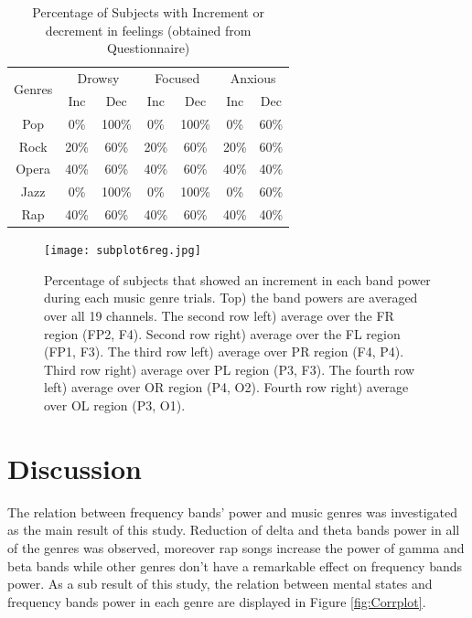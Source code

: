 \documentclass[9pt,twocolumn]{paper-template}
\begin{document}
\begin{table}
\centering
\caption{Percentage of Subjects with Increment or decrement in feelings  (obtained from Questionnaire) }
\label{table:POIOD}
  \begin{tabular}{c | c c | c c | c c}
        \multirow{2}{*}{Genres} &
      \multicolumn{2}{c}{Drowsy} &
      \multicolumn{2}{c}{Focused} &
      \multicolumn{2}{c}{Anxious} \\
    & Inc & Dec & Inc& Dec & Inc & Dec \\
    \hline
    Pop & 0\% & 100\% & 0\% & 100\% & 0\% & 60\% \\
        Rock & 20\% & 60\% & 20\% & 60\% & 20\% & 60\% \\
        Opera & 40\% & 60\% & 40\% & 60\% & 40\% & 40\% \\
        Jazz & 0\% & 100\% & 0\% & 100\% & 0\% & 60\% \\
        Rap & 40\% & 60\% & 40\% & 60\% & 40\% & 40\% \\
      \end{tabular}
\end{table}





\begin{figure}[h!]
	\centering
	\texttt{[image: subplot6reg.jpg]}
 	\caption{Percentage of subjects that showed an increment in each band power during each music genre trials. Top) the band powers are averaged over all 19 channels. The second row left) average over the FR region (FP2, F4). Second row right) average over the FL region (FP1, F3). The third row left) average over PR region (F4, P4). Third row right) average over PL region (P3, F3). The fourth row left) average over OR region (P4, O2). Fourth row right) average over OL region (P3, O1).}
  	\label{fig:subplot6reg}
\end{figure}

\section*{Discussion}
The relation between frequency bands' power and music genres was investigated as the main result of this study. Reduction of delta and theta bands power in all of the genres was observed, moreover rap songs increase the power of gamma and beta bands while other genres don’t have a remarkable effect on frequency bands power. As a sub result of this study, the relation between mental states and frequency bands power in each genre are displayed in Figure \ref{fig:Corrplot}.\\
\end{document}
